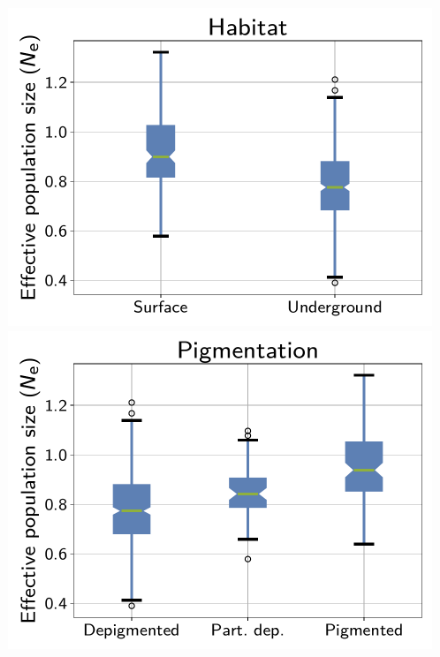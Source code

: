 \documentclass{article}
\begin{document}
    \begin{figure}[t]
        \centering
        \begin{minipage}{0.32\linewidth}
            \includegraphics[width=\linewidth, page=1]{isopods/12CDS_SiteMutSelBranchNe_Rep_LogPopulationSize_eco_merged}
        \end{minipage} \hfill
        \hfill
        \begin{minipage}{0.32\linewidth}
            \includegraphics[width=\linewidth, page=1]{isopods/12CDS_SiteMutSelBranchNe_Rep_LogPopulationSize_pig_merged}
        \end{minipage} \hfill

\end{figure}
\end{document}
